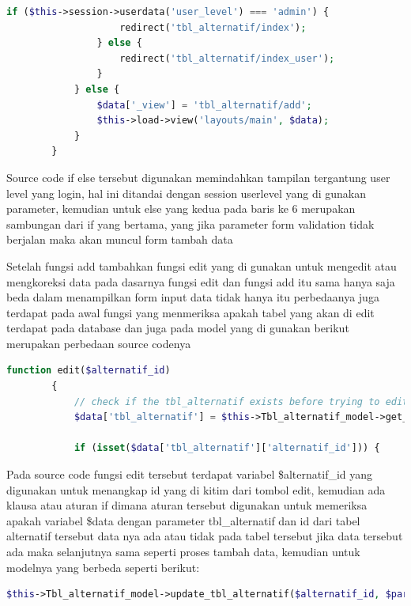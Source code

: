 \begin{lstlisting}[language=PHP]
	if ($this->session->userdata('user_level') === 'admin') {  
	                redirect('tbl_alternatif/index');  
	            } else {  
	                redirect('tbl_alternatif/index_user');  
	            }  
	        } else {  
	            $data['_view'] = 'tbl_alternatif/add';  
	            $this->load->view('layouts/main', $data);  
	        }  
	    }  
\end{lstlisting}

Source code if else tersebut digunakan memindahkan tampilan tergantung user level yang login, hal ini ditandai dengan session userlevel yang di gunakan parameter, kemudian untuk else yang kedua pada baris ke 6 merupakan sambungan dari if yang bertama, yang jika parameter form validation tidak berjalan maka akan muncul form tambah data\par
	Setelah fungsi add tambahkan fungsi edit yang di gunakan untuk mengedit atau mengkoreksi data pada dasarnya fungsi edit dan fungsi add itu sama hanya saja beda dalam menampilkan form input data tidak hanya itu perbedaanya juga terdapat pada awal fungsi yang menmeriksa apakah tabel yang akan di edit terdapat pada database dan juga pada model yang di gunakan  berikut merupakan perbedaan source codenya \par

\begin{lstlisting}[language=PHP]
	function edit($alternatif_id)  
	    {  
	        // check if the tbl_alternatif exists before trying to edit it  
	        $data['tbl_alternatif'] = $this->Tbl_alternatif_model->get_tbl_alternatif($alternatif_id);  
	  
	        if (isset($data['tbl_alternatif']['alternatif_id'])) {  
\end{lstlisting}

Pada source code fungsi edit tersebut terdapat variabel \$alternatif\_id yang digunakan untuk menangkap id yang di kitim dari tombol edit, kemudian ada klausa atau aturan if dimana aturan tersebut digunakan untuk memeriksa apakah variabel \$data dengan parameter tbl\_alternatif dan id dari tabel alternatif tersebut data nya ada atau tidak pada tabel tersebut jika data tersebut ada maka selanjutnya sama seperti proses tambah data, kemudian untuk modelnya yang berbeda seperti berikut:

\begin{lstlisting}[language=PHP]
 $this->Tbl_alternatif_model->update_tbl_alternatif($alternatif_id, $params);  
\end{lstlisting}

